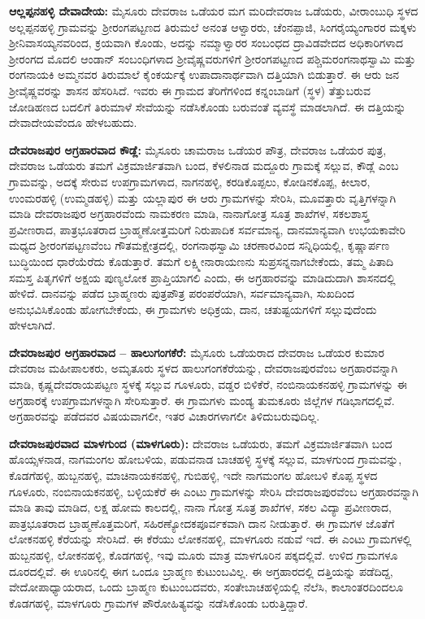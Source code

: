 \textbf{ಆಲ್ಲಪ್ಪನಹಳ್ಳಿ ದೇವಾದೇಯ:} ಮೈಸೂರು ದೇವರಾಜ ಒಡೆಯರ ಮಗ ಮರಿದೇವರಾಜ ಒಡೆಯರು, ವೀರಾಂಬುಧಿ ಸ್ಥಳದ ಅಲ್ಲಪ್ಪನಹಳ್ಳಿ ಗ್ರಾಮವನ್ನು ಶ‍್ರೀರಂಗಪಟ್ಟಣದ ತಿರುಮಲೆ ಅನಂತ ಆಳ್ವಾರರು, ಚೆಂನಪ್ಪಾಜಿ, ಸಿಂಗರೈಯ್ಯಂಗಾರರ ಮಕ್ಕಳು ಶ‍್ರೀನಿವಾಸಯ್ಯನವರಿಂದ, ಕ್ರಯವಾಗಿ ಕೊಂಡು, ಅದನ್ನು ನಮ್ಮಾಳ್ವಾರರ ಸಂಬಂಧದ ದ್ರಾವಿಡವೇದದ ಅಧಿಕಾರಿಗಳಾದ ಶ‍್ರೀರಂಗದ ಮೊದಲಿ ಆಂಡಾನ್​ ಸಂಬಂಧಿಗಳಾದ ಶ‍್ರೀವೈಷ್ಣವರುಗಳಿಗೆ ಶ‍್ರೀರಂಗಪಟ್ಟಣದ ಪಶ್ಚಿಮರಂಗನಾಥಸ್ವಾಮಿ ಮತ್ತು ರಂಗನಾಯಕಿ ಅಮ್ಮನವರ ತಿರುಮಾಲೆ ಕೈಂಕರ್ಯಕ್ಕೆ ಉಪಾದಾನಾರ್ಥವಾಗಿ ದತ್ತಿಯಾಗಿ ಬಿಡುತ್ತಾರೆ. ಈ ಆರು ಜನ ಶ‍್ರೀವೈಷ್ಣವರನ್ನು ಶಾಸನ ಹೆಸರಿಸಿದೆ. ಇವರು ಈ ಗ್ರಾಮದ ತೆರಿಗೆಗಳಿಂದ ಕನ್ನಂಬಾಡಿಗೆ (ಸ್ಥಳ) ತೆತ್ತುಬರುವ ಜೋಡಿಹಣದ ಬದಲಿಗೆ ತಿರುಮಾಳೆ ಸೇವೆಯನ್ನು ನಡೆಸಿಕೊಂಡು ಬರುವಂತೆ ವ್ಯವಸ್ಥೆ ಮಾಡಲಾಗಿದೆ. ಈ ದತ್ತಿಯನ್ನು ದೇವಾದೇಯವೆಂದೂ ಹೇಳಬಹುದು.

\textbf{ದೇವರಾಜಪುರ ಅಗ್ರಹಾರವಾದ ಕೌಡ್ಲೆ:} ಮೈಸೂರು ಚಾಮರಾಜ ಒಡೆಯರ ಪೌತ್ರ, ದೇವರಾಜ ಒಡೆಯರ ಪುತ್ರ, ದೇವರಾಜ ಒಡೆಯರು ತಮಗೆ ವಿಕ್ರಮಾರ್ಜಿತವಾಗಿ ಬಂದ, ಕೆಳಲಿನಾಡ ಮದ್ದೂರು ಗ್ರಾಮಕ್ಕೆ ಸಲ್ಲುವ, ಕೌಡ್ಲೆ ಎಂಬ ಗ್ರಾಮವನ್ನು, ಅದಕ್ಕೆ ಸೇರುವ ಉಪಗ್ರಾಮಗಳಾದ, ನಾಗನಹಳ್ಳಿ, ಕರಡಿಕೊಪ್ಪಲು, ಕೋಡಿನಕೊಪ್ಪ, ಕೀಲಾರ, ಉಂಮರಹಳ್ಳಿ (ಉಮ್ಮಡಹಳ್ಳಿ) ಮತ್ತು ಯಲ್ಲಾಪುರ ಈ ಆರು ಗ್ರಾಮಗಳನ್ನು ಸೇರಿಸಿ, ಮೂವತ್ತಾರು ವೃತ್ತಿಗಳನ್ನಾಗಿ ಮಾಡಿ ದೇವರಾಜಪುರ ಅಗ್ರಹಾರವೆಂದು ನಾಮಕರಣ ಮಾಡಿ, ನಾನಾಗೋತ್ರ ಸೂತ್ರ ಶಾಖೆಗಳ, ಸಕಲಶಾಸ್ತ್ರ ಪ್ರವೀಣರಾದ, ಪಾತ್ರಭೂತರಾದ ಬ್ರಾಹ್ಮಣೋತ್ತಮರಿಗೆ ನಿರುಪಾದಿಕ ಸರ್ವಮಾನ್ಯ, ದಾನಮಾನ್ಯವಾಗಿ ಉಭಯಕಾವೇರಿ ಮಧ್ಯದ ಶ‍್ರೀರಂಗಪಟ್ಟಣವೆಂಬ ಗೌತಮಕ್ಷೇತ್ರದಲ್ಲಿ, ರಂಗನಾಥಸ್ವಾಮಿ ಚರಣಾರವಿಂದ ಸನ್ನಿಧಿಯಲ್ಲಿ, ಕೃಷ್ಣಾರ್ಪಣ ಬುದ್ಧಿಯಿಂದ ಧಾರೆಯೆರೆದು ಕೊಡುತ್ತಾರೆ. ತಮಗೆ ಲಕ್ಷ್ಮೀನಾರಾಯಣನು ಸುಪ್ರಸನ್ನನಾಗಬೇಕೆಂದು, ತಮ್ಮ ಪಿತಾದಿ ಸಮಸ್ತ ಪಿತೃಗಳಿಗೆ ಅಕ್ಷಯ ಪುಣ್ಯಲೋಕ ಪ್ರಾಪ್ತಿಯಾಗಲಿ ಎಂದು, ಈ ಅಗ್ರಹಾರವನ್ನು ಮಾಡಿದುದಾಗಿ ಶಾಸನದಲ್ಲಿ ಹೇಳಿದೆ. ದಾನವನ್ನು ಪಡೆದ ಬ್ರಾಹ್ಮಣರು ಪುತ್ರಪೌತ್ರ ಪರಂಪರೆಯಾಗಿ, ಸರ್ವಮಾನ್ಯವಾಗಿ, ಸುಖದಿಂದ ಅನುಭವಿಸಿಕೊಂಡು ಹೋಗಬೇಕೆಂದು, ಈ ಗ್ರಾಮಗಳು ಅಧಿಕ್ರಯ, ದಾನ, ಚತುಷ್ಟಯಗಳಿಗೆ ಸಲ್ಲುವುದೆಂದು ಹೇಳಲಾಗಿದೆ.

\textbf{ದೇವರಾಜಪುರ ಅಗ್ರಹಾರವಾದ – ಹಾಲುಗಂಗಕೆರೆ:} ಮೈಸೂರು ಒಡೆಯರಾದ ದೇವರಾಜ ಒಡೆಯರ ಕುಮಾರ ದೇವರಾಜ ಮಹೀಪಾಲಕರು, ಅಮೃತೂರು ಸ್ಥಳದ ಹಾಲುಗಂಗಕೆರೆಯನ್ನು, ದೇವರಾಜಪುರವೆಂಬ ಅಗ್ರಹಾರವನ್ನಾಗಿ ಮಾಡಿ, ಕೃಷ್ಣದೇವರಾಯಪಟ್ಟಣ ಸ್ಥಳಕ್ಕೆ ಸಲ್ಲುವ ಗೂಳೂರು, ವಡ್ಡರ ಬಿಳಿಕೆರೆ, ನಂಬಿನಾಯಕನಹಳ್ಳಿ ಗ್ರಾಮಗಳನ್ನು ಈ ಅಗ್ರಹಾರಕ್ಕೆ ಉಪಗ್ರಾಮಗಳನ್ನಾಗಿ ಸೇರಿಸುತ್ತಾರೆ. ಈ ಗ್ರಾಮಗಳು ಮಂಡ್ಯ ತುಮಕೂರು ಜಿಲ್ಲೆಗಳ ಗಡಿಭಾಗದಲ್ಲಿವೆ. ಅಗ್ರಹಾರವನ್ನು ಪಡೆದವರ ವಿಷಯವಾಗಲೀ, ಇತರ ವಿಚಾರಗಳಾಗಲೀ ತಿಳಿದುಬರುವುದಿಲ್ಲ.

\textbf{ದೇವರಾಜಪುರವಾದ ಮಾಳಗುಂದ (ಮಾಳಗೂರು):} ದೇವರಾಜ ಒಡೆಯರು, ತಮಗೆ ವಿಕ್ರಮಾರ್ಜಿತವಾಗಿ ಬಂದ ಹೊಯ್ಸಳನಾಡ, ನಾಗಮಂಗಲ ಹೋಬಳಿಯ, ಪಡುವನಾಡ ಬಾಚಹಳ್ಳಿ ಸ್ಥಳಕ್ಕೆ ಸಲ್ಲುವ, ಮಾಳಗುಂದ ಗ್ರಾಮವನ್ನು, ಕೊಡಗೆಹಳ್ಳಿ, ಹುಬ್ಬನಹಳ್ಳಿ, ಮಾಚಿನಾಯಕನಹಳ್ಳಿ, ಗುಬಿಹಳ್ಳಿ, ಇದೇ ನಾಗಮಂಗಲ ಹೋಬಳಿ ಕೊಪ್ಪ ಸ್ಥಳದ ಗೂಳೂರು, ನಂಬಿನಾಯಕನಹಳ್ಳಿ, ಬಳ್ಳಿಯಕೆರೆ ಈ ಎಂಟು ಗ್ರಾಮಗಳನ್ನು ಸೇರಿಸಿ ದೇವರಾಜಪುರವೆಂಬ ಅಗ್ರಹಾರವನ್ನಾಗಿ ಮಾಡಿ ತಾವು ಮಾಡಿದ, ಲಕ್ಷ ಹೋಮ ಕಾಲದಲ್ಲಿ, ನಾನಾ ಗೋತ್ರ ಸೂತ್ರ ಶಾಖೆಗಳ, ಸಕಲ ವಿದ್ಯಾ ಪ್ರವೀಣರಾದ, ಪಾತ್ರಭೂತರಾದ ಬ್ರಾಹ್ಮಣೊತ್ತಮರಿಗೆ, ಸಹಿರಣ್ಯೋದಕಪೂರ್ವಕವಾಗಿ ದಾನ ನೀಡುತ್ತಾರೆ. ಈ ಗ್ರಾಮಗಳ ಜೊತೆಗೆ ಲೋಕನಹಳ್ಳಿ ಕೆರೆಯನ್ನು ಸೇರಿಸಿದೆ. ಈ ಕೆರೆಯು ಲೋಕನಹಳ್ಳಿ, ಮಾಳಗೂರು ನಡುವೆ ಇದೆ. ಈ ಎಂಟು ಗ್ರಾಮಗಳಲ್ಲಿ ಹುಬ್ಬನಹಳ್ಳಿ, ಲೋಕನಹಳ್ಳಿ, ಕೊಡಗಹಳ್ಳಿ, ಇವು ಮೂರು ಮಾತ್ರ ಮಾಳಗೂರಿನ ಪಕ್ಕದಲ್ಲಿವೆ. ಉಳಿದ ಗ್ರಾಮಗಳೂ ದೂರದಲ್ಲಿವೆ. ಈ ಊರಿನಲ್ಲಿ ಈಗ ಒಂದೂ ಬ್ರಾಹ್ಮಣ ಕುಟುಂಬವಿಲ್ಲ. ಈ ಅಗ್ರಹಾರದಲ್ಲಿ ದತ್ತಿಯನ್ನು ಪಡೆದಿದ್ದ, ವೇದೋಪಾಧ್ಯಾಯರಾದ, ಒಂದು ಬ್ರಾಹ್ಮಣ ಕುಟುಂಬದವರು, ಸಂತೇಬಾಚಹಳ್ಳಿಯಲ್ಲಿ ನೆಲೆಸಿ, ಕಾಲಾಂತರದಿಂದಲೂ ಕೊಡಗಹಳ್ಳಿ, ಮಾಳಗೂರು ಗ್ರಾಮಗಳ ಪೌರೋಹಿತ್ಯವನ್ನು ನಡೆಸಿಕೊಂಡು ಬರುತ್ತಿದ್ದಾರೆ.

